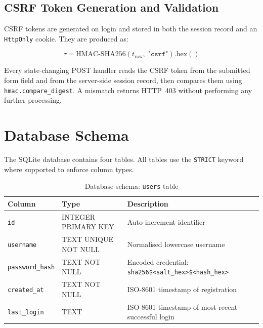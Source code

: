 \subsection{CSRF Token Generation and Validation}
\label{sec:arch_csrf}

CSRF tokens are generated on login and stored in both the session record and an \texttt{HttpOnly} cookie. They are produced as:

\begin{equation}
  \tau = \mathrm{HMAC\text{-}SHA256}(t_{\text{raw}},\; \texttt{"csrf"}).\mathrm{hex}()
  \label{eq:csrf_generation}
\end{equation}

Every state-changing POST handler reads the CSRF token from the submitted form field and from the server-side session record, then compares them using \texttt{hmac.compare\_digest}. A mismatch returns HTTP~403 without performing any further processing.

\section{Database Schema}
\label{sec:arch_schema}

The SQLite database contains four tables. All tables use the \texttt{STRICT} keyword where supported to enforce column types.

\begin{table}[H]
\centering
\caption{Database schema: \texttt{users} table}
\label{tab:schema_users}
\begin{tabularx}{\textwidth}{|l|l|X|}
\hline
\textbf{Column} & \textbf{Type} & \textbf{Description} \\\hline
\texttt{id}              & INTEGER PRIMARY KEY & Auto-increment identifier \\\hline
\texttt{username}        & TEXT UNIQUE NOT NULL & Normalised lowercase username \\\hline
\texttt{password\_hash}  & TEXT NOT NULL & Encoded credential: \texttt{sha256\$<salt\_hex>\$<hash\_hex>} \\\hline
\texttt{created\_at}     & TEXT NOT NULL & ISO-8601 timestamp of registration \\\hline
\texttt{last\_login}     & TEXT & ISO-8601 timestamp of most recent successful login \\\hline
\end{tabularx}
\end{table}

